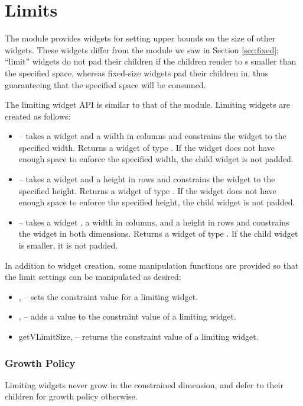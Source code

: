 \section{Limits}
\label{sec:limits}

The  module provides widgets for setting upper bounds on
the size of other widgets.  These widgets differ from the 
module we saw in Section \ref{sec:fixed}; ``limit'' widgets do not pad
their children if the children render to s smaller than the
specified space, whereas fixed-size widgets pad their children in,
thus guaranteeing that the specified space will be consumed.

The limiting widget API is similar to that of the  module.
Limiting widgets are created as follows:

\begin{itemize}
\item {} -- takes a widget  and a width in
  columns and constrains the widget to the specified width.  Returns a
  widget of type .  If the  widget
  does not have enough space to enforce the specified width, the child
  widget is not padded.
\item {} -- takes a widget  and a height in rows
  and constrains the widget to the specified height.  Returns a widget
  of type .  If the  widget does not
  have enough space to enforce the specified height, the child widget
  is not padded.
\item {} -- takes a widget , a width in
  columns, and a height in rows and constrains the widget in both
  dimensions.  Returns a widget of type .  If the child widget is smaller, it is not padded.
\end{itemize}

In addition to widget creation, some manipulation functions are
provided so that the limit settings can be manipulated as desired:

\begin{itemize}
\item {},  -- sets the constraint value for
  a limiting widget.
\item {},  -- adds a value to the
  constraint value of a limiting widget.
\item {getVLimitSize},  -- returns the constraint
  value of a limiting widget.
\end{itemize}

\subsubsection{Growth Policy}

Limiting widgets never grow in the constrained dimension, and defer to
their children for growth policy otherwise.
